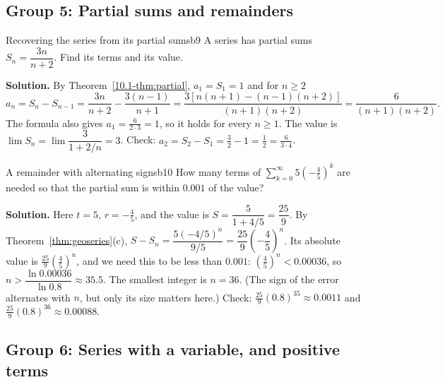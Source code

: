 \documentclass[11pt]{article}
\begin{document}
\subsection*{Group 5: Partial sums and remainders}

\begin{exmp}{Recovering the series from its partial sums}{b9}
A series has partial sums $S_n=\dfrac{3n}{n+2}$. Find its terms and its value.

\textbf{Solution.} By Theorem~\ref{10.1-thm:partial}, $a_1=S_1=1$ and for $n\ge2$
\[
a_n=S_n-S_{n-1}=\frac{3n}{n+2}-\frac{3(n-1)}{n+1}=\frac{3\left[n(n+1)-(n-1)(n+2)\right]}{(n+1)(n+2)}=\frac6{(n+1)(n+2)}.
\]
The formula also gives $a_1=\frac6{2\cdot3}=1$, so it holds for every $n\ge1$. The value is $\lim S_n=\lim\dfrac{3}{1+2/n}=3$. Check: $a_2=S_2-S_1=\frac32-1=\frac12=\frac6{3\cdot4}$.
\end{exmp}

\begin{exmp}{A remainder with alternating signs}{b10}
How many terms of $\displaystyle\sum_{k=0}^\infty5\left(-\frac45\right)^k$ are needed so that the partial sum is within $0.001$ of the value?

\textbf{Solution.} Here $t=5$, $r=-\frac45$, and the value is $S=\dfrac5{1+4/5}=\dfrac{25}9$. By Theorem~\ref{thm:geoseries}(c), $S-S_n=\dfrac{5(-4/5)^n}{9/5}=\dfrac{25}9\left(-\dfrac45\right)^n$. Its absolute value is $\frac{25}9\left(\frac45\right)^n$, and we need this to be less than $0.001$: $\left(\frac45\right)^n<0.00036$, so $n>\dfrac{\ln0.00036}{\ln0.8}\approx35.5$. The smallest integer is $n=36$. (The sign of the error alternates with $n$, but only its size matters here.) Check: $\frac{25}9(0.8)^{35}\approx0.0011$ and $\frac{25}9(0.8)^{36}\approx0.00088$.
\end{exmp}

\subsection*{Group 6: Series with a variable, and positive terms}
\end{document}
